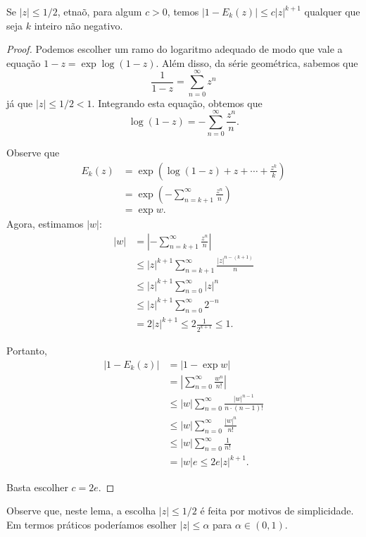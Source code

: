     \begin{lema}
    \label{lema-wstr-est-factor}
    Se $|z| \leq 1/2$, etnaõ, para algum $c>0$, temos $|1-E_k(z)| \leq c|z|^{k+1}$ qualquer que seja $k$ inteiro não negativo.
    \end{lema}
    \begin{proof}
    Podemos escolher um ramo do logaritmo adequado de modo que vale a equação $1-z = \exp{\log(1-z)}$. Além disso, da série geométrica, sabemos que 
    $$ \frac{1}{1-z} = \sum_{n=0}^{\infty}z^n $$
    já que $|z| \leq 1/2 < 1$. Integrando esta equação, obtemos que
    $$ \log(1-z) = - \sum_{n=0}^{\infty}\frac{z^n}{n}. $$
    
    Observe que 
    \begin{align*}
        E_k(z) &= \exp{\left(\log(1-z) + z + \cdots + \frac{z^k}{k}\right)} \\
        &= \exp(-\sum_{n=k+1}^{\infty}\frac{z^n}{n}) \\
        &= \exp{w}.
    \end{align*}
    Agora, estimamos $|w|$:
    \begin{align*}
        |w| &= \left | -\sum_{n=k+1}^{\infty}\frac{z^n}{n} \right | \\
        &\leq |z|^{k+1}\sum_{n=k+1}^{\infty}\frac{|z|^{n - (k+1)}}{n} \\
        &\leq |z|^{k+1}\sum_{n=0}^{\infty}|z|^n \\
        &\leq |z|^{k+1}\sum_{n=0}^{\infty} 2^{-n} \\
        &= 2|z|^{k+1} \leq 2 \frac{1}{2^{k+1}} \leq 1.
    \end{align*}
    
    Portanto,
    \begin{align*}
        |1 - E_k(z)| &= |1 - \exp{w}| \\
        &= \left | \sum_{n=0}^{\infty}\frac{w^n}{n!} \right | \\
        &\leq |w|\sum_{n=0}^{\infty}\frac{|w|^{n-1}}{n\cdot (n-1)!} \\
        &\leq |w|\sum_{n=0}^{\infty}\frac{|w|^n}{n!} \\
        &\leq |w|\sum_{n=0}^{\infty}\frac{1}{n!} \\
        &=|w|e \leq 2e|z|^{k+1}.
    \end{align*}
    
    Basta escolher $c = 2e$.
    \end{proof}
    
    
    Observe que, neste lema, a escolha $|z| \leq 1/2$ é feita por motivos de simplicidade. Em termos práticos poderíamos esolher $|z| \leq \alpha$ para $\alpha \in (0,1)$.
    
